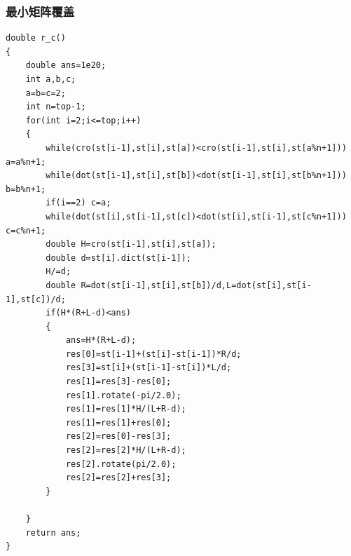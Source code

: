 \documentclass[12pt, a4paper, oneside]{ctexart}
\begin{document}
\newpage 
\subsubsection{最小矩阵覆盖} 
\begin{lstlisting}
double r_c()
{
    double ans=1e20;
    int a,b,c;
    a=b=c=2;
    int n=top-1;
    for(int i=2;i<=top;i++)
    {
        while(cro(st[i-1],st[i],st[a])<cro(st[i-1],st[i],st[a%n+1])) a=a%n+1;
        while(dot(st[i-1],st[i],st[b])<dot(st[i-1],st[i],st[b%n+1])) b=b%n+1;
        if(i==2) c=a;
        while(dot(st[i],st[i-1],st[c])<dot(st[i],st[i-1],st[c%n+1])) c=c%n+1;
        double H=cro(st[i-1],st[i],st[a]);
        double d=st[i].dict(st[i-1]);
        H/=d;
        double R=dot(st[i-1],st[i],st[b])/d,L=dot(st[i],st[i-1],st[c])/d;
        if(H*(R+L-d)<ans)
        {
            ans=H*(R+L-d);
            res[0]=st[i-1]+(st[i]-st[i-1])*R/d;
            res[3]=st[i]+(st[i-1]-st[i])*L/d;
            res[1]=res[3]-res[0];
            res[1].rotate(-pi/2.0);
            res[1]=res[1]*H/(L+R-d);
            res[1]=res[1]+res[0];
            res[2]=res[0]-res[3];
            res[2]=res[2]*H/(L+R-d);
            res[2].rotate(pi/2.0);
            res[2]=res[2]+res[3]; 
        }
        
    }
    return ans;
}
\end{lstlisting}

\newpage 
\end{document}
